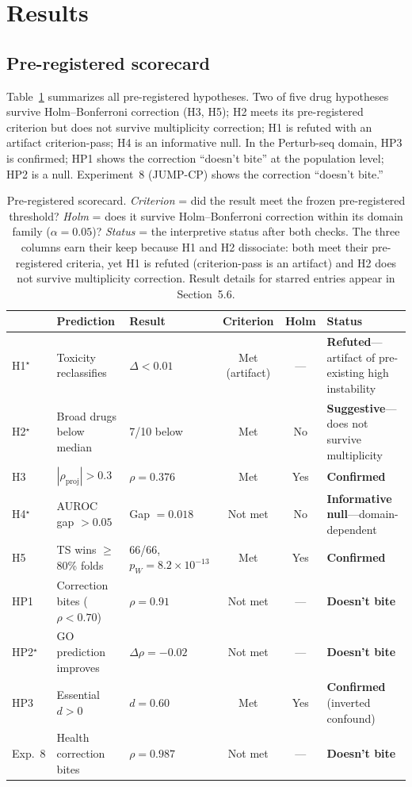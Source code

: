 \documentclass[11pt]{article}
\begin{document}
\section{Results}

\subsection{Pre-registered scorecard}

Table~\ref{tab:scorecard} summarizes all pre-registered hypotheses.
Two of five drug hypotheses survive Holm--Bonferroni correction (H3, H5);
H2 meets its pre-registered criterion but does not survive multiplicity
correction; H1 is refuted with an artifact criterion-pass; H4 is an
informative null.
In the Perturb-seq domain, HP3 is confirmed; HP1 shows the correction
``doesn't bite'' at the population level; HP2 is a null. Experiment~8
(JUMP-CP) shows the correction ``doesn't bite.''

\begin{table}[t]
\centering
\caption{Pre-registered scorecard.
\emph{Criterion} = did the result meet the frozen pre-registered
threshold?
\emph{Holm} = does it survive Holm--Bonferroni correction within its
domain family ($\alpha = 0.05$)?
\emph{Status} = the interpretive status after both checks.
The three columns earn their keep because H1 and H2 dissociate:
both meet their pre-registered criteria, yet H1 is refuted
(criterion-pass is an artifact) and H2 does not survive multiplicity
correction.
Result details for starred entries appear in Section~5.6.}
\label{tab:scorecard}
\small
\begin{tabular}{lllccp{3.6cm}}
\toprule
 & Prediction & Result & Criterion & Holm & Status \\
\midrule
H1$^\star$ & Toxicity reclassifies & $\Delta < 0.01$ & Met (artifact) & --- & \textbf{Refuted}---artifact of pre-existing high instability \\
H2$^\star$ & Broad drugs below median & 7/10 below & Met & No & \textbf{Suggestive}---does not survive multiplicity \\
H3 & $|\rho_{\text{proj}}| > 0.3$ & $\rho = 0.376$ & Met & Yes & \textbf{Confirmed} \\
H4$^\star$ & AUROC gap $> 0.05$ & Gap $= 0.018$ & Not met & No & \textbf{Informative null}---domain-dependent \\
H5 & TS wins $\geq$80\% folds & 66/66, $p_W\!=\!8.2\!\times\!10^{-13}$ & Met & Yes & \textbf{Confirmed} \\
\midrule
HP1 & Correction bites ($\rho < 0.70$) & $\rho = 0.91$ & Not met & --- & \textbf{Doesn't bite} \\
HP2$^\star$ & GO prediction improves & $\Delta\rho = -0.02$ & Not met & --- & \textbf{Doesn't bite} \\
HP3 & Essential $d > 0$ & $d = 0.60$ & Met & Yes & \textbf{Confirmed} (inverted confound) \\
\midrule
Exp.~8 & Health correction bites & $\rho = 0.987$ & Not met & --- & \textbf{Doesn't bite} \\
\bottomrule
\end{tabular}
\end{table}
\end{document}
